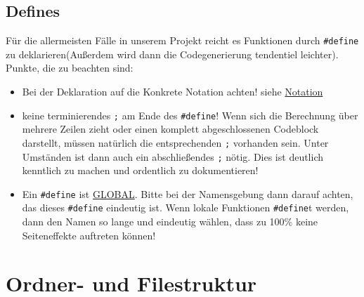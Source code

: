 \documentclass[]{scrartcl}
\begin{document}
\subsection{Defines}
\label{sbsec:Defines}
Für die allermeisten Fälle in unserem Projekt reicht es Funktionen durch \lstinline|#define| zu deklarieren(Außerdem wird dann die Codegenerierung tendentiel leichter). Punkte, die zu beachten sind:
\begin{itemize}
\item Bei der Deklaration auf die Konkrete Notation achten! siehe \href{http://www2.informatik.uni-halle.de/lehre/c/c_define.html}{Notation}
\item keine terminierendes \lstinline|;| am Ende des \lstinline|#define|! Wenn sich die Berechnung über mehrere Zeilen zieht oder einen komplett abgeschlossenen Codeblock darstellt, müssen natürlich die entsprechenden \lstinline|;| vorhanden sein. Unter Umständen ist dann auch ein abschließendes \lstinline|;| nötig. Dies ist deutlich kenntlich zu machen und ordentlich zu dokumentieren!
\item Ein \lstinline|#define| ist \underline{GLOBAL}. Bitte bei der Namensgebung dann darauf achten, das dieses \lstinline|#define| eindeutig ist. Wenn lokale Funktionen \lstinline|#define|t werden, dann den Namen so lange und eindeutig wählen, dass zu 100\% keine Seiteneffekte auftreten können!
\end{itemize}


\section{Ordner- und Filestruktur}
\end{document}
